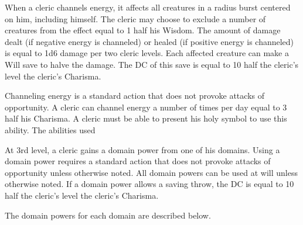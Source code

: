 When a cleric channels energy, it affects all creatures in a \areamed radius burst centered on him, including himself. The cleric may choose to exclude a number of creatures from the effect equal to 1 \add half his Wisdom. The amount of damage dealt (if negative energy is channeled) or healed (if positive energy is channeled) is equal to 1d6 damage per two cleric levels. Each affected creature can make a Will save to halve the damage. The DC of this save is equal to 10 \add half the cleric's level \add the cleric's Charisma.

Channeling energy is a standard action that does not provoke attacks of opportunity. A cleric can channel energy a number of times per day equal to 3 \add half his Charisma. A cleric must be able to present his holy symbol to use this ability. The abilities used 

 At 3rd level, a cleric gains a domain power from one of his domains. Using a domain power requires a standard action that does not provoke attacks of opportunity unless otherwise noted. All domain powers can be used at will unless otherwise noted. If a domain power allows a saving throw, the DC is equal to 10 \add half the cleric's level \add the cleric's Charisma.
\par The domain powers for each domain are described below.

